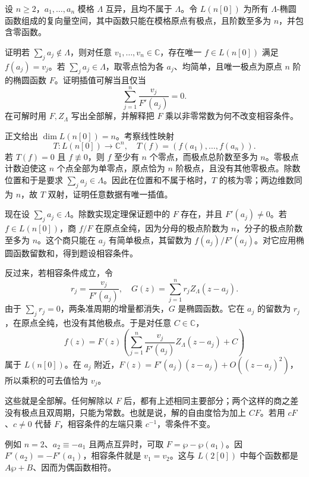 \begin{exercise}[插值的相容条件]\label{b3:ex:22-5}
设 \(n\ge2\)，\(a_1,\ldots,a_n\) 模格 \(\Lambda\) 互异，且均不属于 \(\Lambda\)。令 \(L(n[0])\) 为所有 \(\Lambda\)-椭圆函数组成的复向量空间，其中函数只能在模格原点有极点，且阶数至多为 \(n\)，并包含零函数。

\ProseParagraphBreak
证明若 \(\sum_j a_j\notin\Lambda\)，则对任意 \(v_1,\ldots,v_n\in\mathbb C\)，存在唯一 \(f\in L(n[0])\) 满足 \(f(a_j)=v_j\)。若 \(\sum_j a_j\in\Lambda\)，取零点恰为各 \(a_j\)、均简单，且唯一极点为原点 \(n\) 阶的椭圆函数 \(F\)。证明插值可解当且仅当
\[
 \sum_{j=1}^n\frac{v_j}{F'(a_j)}=0.
\]
在可解时用 \(F,Z_\Lambda\) 写出全部解，并解释把 \(F\) 乘以非零常数为何不改变相容条件。
\end{exercise}
\begin{solution}
正文给出 \(\dim L(n[0])=n\)。考察线性映射
\[
 T:L(n[0])\longrightarrow\mathbb C^n,\quad
 T(f)=(f(a_1),\ldots,f(a_n)).
\]
若 \(T(f)=0\) 且 \(f\not\equiv0\)，则 \(f\) 至少有 \(n\) 个零点，而极点总阶数至多为 \(n\)。零极点计数迫使这 \(n\) 个点全部为单零点，原点恰为 \(n\) 阶极点，且没有其他零极点。除数位置和于是要求 \(\sum_j a_j\in\Lambda\)。因此在位置和不属于格时，\(T\) 的核为零；两边维数同为 \(n\)，故 \(T\) 双射，证明任意数据有唯一插值。

现在设 \(\sum_j a_j\in\Lambda\)。除数实现定理保证题中的 \(F\) 存在，并且 \(F'(a_j)\ne0\)。若 \(f\in L(n[0])\)，商 \(f/F\) 在原点全纯，因为分母的极点阶数为 \(n\)，分子的极点阶数至多为 \(n\)。这个商只能在 \(a_j\) 有简单极点，其留数为 \(f(a_j)/F'(a_j)\)。对它应用椭圆函数留数和，得到题设相容条件。

反过来，若相容条件成立，令
\[
 r_j=\frac{v_j}{F'(a_j)},\quad
 G(z)=\sum_{j=1}^n r_j Z_\Lambda(z-a_j).
\]
由于 \(\sum_jr_j=0\)，两条准周期的增量都消失，\(G\) 是椭圆函数。它在 \(a_j\) 的留数为 \(r_j\)，在原点全纯，也没有其他极点。于是对任意 \(C\in\mathbb C\)，
\[
 f(z)=F(z)\left(\sum_{j=1}^n
                  \frac{v_j}{F'(a_j)}Z_\Lambda(z-a_j)+C\right)
\]
属于 \(L(n[0])\)。在 \(a_j\) 附近，\(F(z)=F'(a_j)(z-a_j)+O((z-a_j)^2)\)，所以乘积的可去值恰为 \(v_j\)。

这些就是全部解。任何解除以 \(F\) 后，都有上述相同主要部分；两个这样的商之差没有极点且双周期，只能为常数。也就是说，解的自由度恰为加上 \(CF\)。若用 \(cF\)、\(c\ne0\) 代替 \(F\)，相容条件的左端只乘 \(c^{-1}\)，零条件不变。

例如 \(n=2\)、\(a_2\equiv-a_1\) 且两点互异时，可取 \(F=\wp-\wp(a_1)\)。因 \(F'(a_2)=-F'(a_1)\)，相容条件就是 \(v_1=v_2\)。这与 \(L(2[0])\) 中每个函数都是 \(A\wp+B\)、因而为偶函数相符。
\end{solution}

